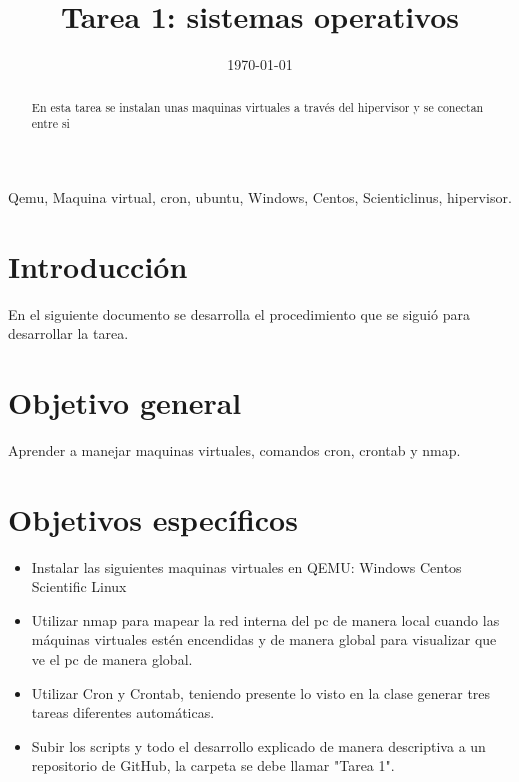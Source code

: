 \documentclass[conference]{IEEEtran}
\begin{document}
\title{Tarea 1: sistemas operativos}

\author{


}

\date{\today}

\pagestyle{plain}

\maketitle

\begin{abstract}
En esta tarea se instalan unas maquinas virtuales a través del hipervisor y se conectan entre si
\end{abstract}

\begin{IEEEkeywords}
Qemu, Maquina virtual, cron, ubuntu, Windows, Centos, Scienticlinus, hipervisor.
\end{IEEEkeywords}

\section{Introducción}
En el siguiente documento se desarrolla el procedimiento que se siguió para desarrollar la tarea.

\section{Objetivo general}
Aprender a manejar maquinas virtuales, comandos cron, crontab y nmap.

\section{Objetivos específicos}

\begin{itemize}
    \item Instalar las siguientes maquinas virtuales en QEMU:
        Windows
        Centos
        Scientific Linux
    \item Utilizar nmap para mapear la red interna del pc de manera local cuando las máquinas virtuales estén encendidas y de manera global para visualizar que ve el pc de manera global.
    \item Utilizar Cron y Crontab, teniendo presente lo visto en la clase generar tres tareas diferentes automáticas.
    \item Subir los scripts y todo el desarrollo explicado de manera descriptiva a un repositorio de GitHub, la carpeta se debe llamar "Tarea 1".
\end{itemize}
\end{document}
